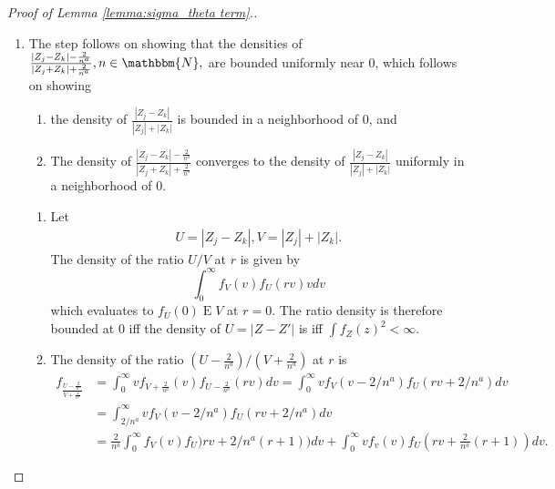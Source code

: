 \documentclass[12pt]{article}
\newcommand{\z}{Z}
\newcommand{\ol}[1]{\overline{#1}}
\DeclareMathOperator{\E}{E}
\begin{document}
\begin{proof}[Proof of Lemma \ref{lemma:sigma_theta term}.]
\begin{enumerate}[wide, labelwidth=!, labelindent=0pt]
  \item \label{lemma:1:step:3}
    The step follows on showing that the densities of
      $\frac{|\z_j-\z_k|-\frac{2}{n^a}}{|\z_j+\z_k|+\frac{2}{n^a}}, n\in\mathbbm{N},$
    are bounded uniformly near $0$, which follows on showing
    \begin{enumerate}
    \item the density of $\frac{|\z_j-\z_k|}{|\z_j|+|\z_k|}$ is bounded in a neighborhood of $0$, and
    \item The density of
$\frac{|\z_j-\z_k|-\frac{2}{n^a}}{|\z_j+\z_k|+\frac{2}{n^a}}$
      converges to the density of $\frac{|\z_j-\z_k|}{|\z_j|+|\z_k|}$ uniformly in a neighborhood of $0$. 
    \end{enumerate}
    \begin{enumerate}[wide, labelwidth=!, labelindent=0pt]      
\item  Let
    \begin{align}
      U=|\z_j-\z_k|, V=|\z_j|+|\z_k|.
    \end{align}
    The density of the ratio $U/V$ at $r$ is given by
    $$
    \int_0^\infty f_V(v)f_U(rv)vdv
    $$
    which evaluates to $f_U(0)\E V$ at $r=0$. The ratio density is therefore bounded at $0$ iff the density of $U=|\z-\z'|$ is iff $\int f_{\z}(z)^2<\infty$.

  \item
    The density of the ratio $(U-\frac{2}{n^a})/(V+\frac{2}{n^a})$ at $r$ is
    \begin{align}
      f_{\frac{U-\frac{2}{n^a}}{V+\frac{2}{n^a}}} &= \int_0^\infty vf_{V+\frac{2}{n^a}}(v)f_{U-\frac{2}{n^a}}(rv)dv
                                  = \int_0^\infty vf_V(v-2/n^a)f_U(rv+2/n^a)dv\\
                                &= \int_{2/n^a}^\infty vf_V(v-2/n^a)f_U(rv+2/n^a)dv\\
      &= \frac{2}{n^a}\int_0^\infty f_V(v)f_U)rv+2/n^a(r+1))dv + \int_0^\infty v f_v(v)f_U(rv+\frac{2}{n^a}(r+1))dv.
    \end{align}


\end{enumerate}
\end{enumerate}
\end{proof}
\end{document}
